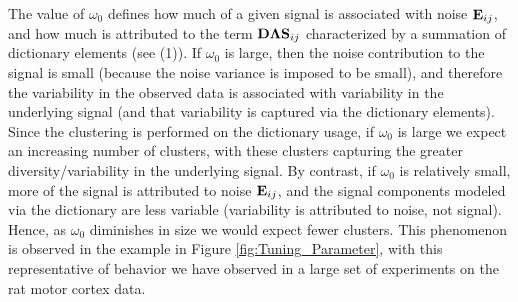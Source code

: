 \documentclass[journal]{IEEEtran}
\begin{document}
The value of $\omega_0$ defines how much of a given signal is associated with noise ${\mathbf E}_{ij}$, and how much is attributed to the term ${\mathbf D}\boldsymbol{\Lambda}{\mathbf S}_{ij}$ characterized by a summation of dictionary elements (see (1)). If $\omega_0$ is large, then the noise contribution to the signal is small (because the noise variance is imposed to be small), and therefore the variability in the observed data is associated with variability in the underlying signal (and that variability is captured via the dictionary elements). Since the clustering is performed on the dictionary usage, if $\omega_0$ is large we expect an increasing number of clusters, with these clusters capturing the greater diversity/variability in the underlying signal. By contrast, if $\omega_0$ is relatively small, more of the signal is attributed to noise ${\mathbf E}_{ij}$, and the signal components modeled via the dictionary are less variable (variability is attributed to noise, not signal). Hence, as $\omega_0$ diminishes in size we would expect fewer clusters. This phenomenon is observed in the example in Figure \ref{fig:Tuning_Parameter}, with this representative of behavior we have observed in a large set of experiments{ on the rat motor cortex data}.
\end{document}

